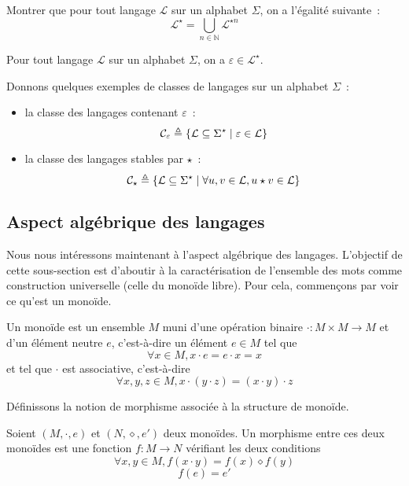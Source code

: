\begin{exercise}
  Montrer que pour tout langage $\mathcal L$ sur un alphabet $\Sigma$, on a
  l'égalité suivante~:
  \[\mathcal L^\star = \bigcup_{n \in \mathbb N} \mathcal L^{\star n}\]
\end{exercise}

\begin{exercise}
  Pour tout langage $\mathcal L$ sur un alphabet $\Sigma$, on a
  $\varepsilon \in \mathcal L^\star$.
\end{exercise}

\begin{example}
  Donnons quelques exemples de classes de langages sur un alphabet $\Sigma$~:
  \begin{itemize}
  \item la classe des langages contenant $\varepsilon$~:
    \[\mathcal C_\varepsilon \triangleq \{\mathcal L \subseteq \Sigma^\star\mid
    \varepsilon \in \mathcal L\}\]
  \item la classe des langages stables par $\star$~:
    \[\mathcal C_\star \triangleq \{\mathcal L \subseteq \Sigma^\star\mid
    \forall u,v\in\mathcal L, u\star v \in \mathcal L\}\]
  \end{itemize}
\end{example}

\subsection{Aspect algébrique des langages}

Nous nous intéressons maintenant à l'aspect algébrique des langages. L'objectif
de cette sous-section est d'aboutir à la caractérisation de l'ensemble des mots
comme construction universelle (celle du monoïde libre). Pour cela, commençons
par voir ce qu'est un monoïde.

\begin{definition}[Monoïde]
  Un monoïde est un ensemble $M$ muni d'une opération binaire
  $\cdot : M \times M \to M$ et d'un élément neutre $e$,
  c'est-à-dire un élément $e\in M$ tel que
  \[\forall x\in M, x\cdot e = e \cdot x = x\]
  et tel que $\cdot$ est associative, c'est-à-dire
  \[\forall x,y,z\in M, x\cdot (y\cdot z) = (x\cdot y) \cdot z\]
\end{definition}

Définissons la notion de morphisme associée à la structure de monoïde.

\begin{definition}
  Soient $(M,\cdot,e)$ et $(N,\diamond,e')$ deux monoïdes. Un morphisme entre
  ces deux monoïdes est une fonction $f : M \to N$ vérifiant les deux conditions
  \begin{equation}
    \forall x,y\in M, f(x\cdot y) = f(x)\diamond f(y)
  \end{equation}
  \begin{equation}
    f(e) = e'
  \end{equation}
\end{definition}

